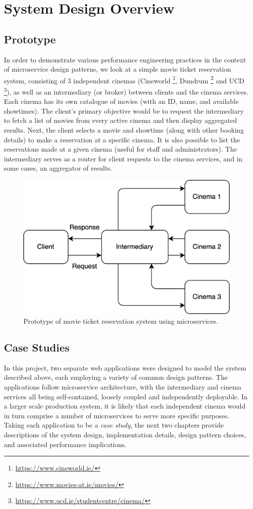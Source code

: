 \chapter{System Design Overview}

\section{Prototype}

In order to demonstrate various performance engineering practices in the context of microservice design patterns, we look at a simple movie ticket reservation system, consisting of 3 independent cinemas (Cineworld \footnote{\url{https://www.cineworld.ie/}}, Dundrum \footnote{\url{https://www.movies-at.ie/movies/}} and UCD \footnote{\url{https://www.ucd.ie/studentcentre/cinema/}}), as well as an intermediary (or broker) between clients and the cinema services. Each cinema has its own catalogue of movies (with an ID, name, and available showtimes). The client's primary objective would be to request the intermediary to fetch a list of movies from every active cinema and then display aggregated results. Next, the client selects a movie and showtime (along with other booking details) to make a reservation at a specific cinema. It is also possible to list the reservations made at a given cinema (useful for staff and administrators). The intermediary serves as a router for client requests to the cinema services, and in some cases, an aggregator of results.

\begin{figure}[H]
	\centering
	\includegraphics[width=0.5\linewidth]{./assets/diagrams/outline-arch.png}
	\caption{Prototype of movie ticket reservation system using microservices.}
	\label{fig:outline-arch}
\end{figure}

\section{Case Studies}

In this project, two separate web applications were designed to model the system described above, each employing a variety of common design patterns. The applications follow microservice architecture, with the intermediary and cinema services all being self-contained, loosely coupled and independently deployable. In a larger scale production system, it is likely that each independent cinema would in turn comprise a number of microservices to serve more specific purposes. Taking each application to be a \textit{case study}, the next two chapters provide descriptions of the system design, implementation details, design pattern choices, and associated performance implications.

